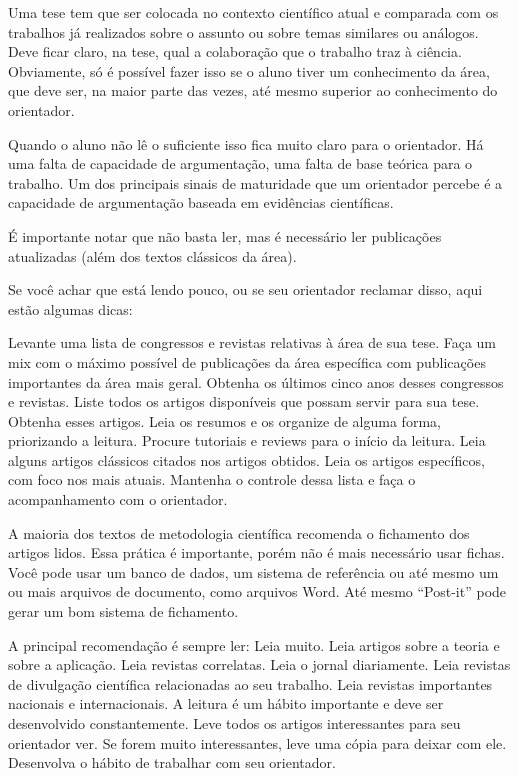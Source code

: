

Uma tese tem que ser colocada no contexto científico atual e comparada com os trabalhos já realizados sobre o assunto ou sobre temas similares ou análogos. Deve ficar claro, na tese, qual a colaboração que o trabalho traz à ciência. Obviamente, só é possível fazer isso se o aluno tiver um conhecimento da área, que deve ser, na maior parte das vezes, até mesmo superior ao conhecimento do orientador.


Quando o aluno não lê o suficiente isso fica muito claro para o orientador. Há uma falta de capacidade de argumentação, uma falta de base teórica para o trabalho. Um dos principais sinais de maturidade que um orientador percebe é a capacidade de argumentação baseada em evidências científicas.


É importante notar que não basta ler, mas é necessário ler publicações atualizadas (além dos textos clássicos da área).


Se você achar que está lendo pouco, ou se seu orientador reclamar disso, aqui estão algumas dicas:

\begin{outline}	
\1	Levante uma lista de congressos e revistas relativas à área de sua tese.
\2	Faça um mix com o máximo possível de publicações da área específica com publicações importantes da área mais geral.
\1	Obtenha os últimos cinco anos desses congressos e revistas.
\1	Liste todos os artigos disponíveis que possam servir para sua tese.
\1	Obtenha esses artigos.
\1	Leia os resumos e os organize de alguma forma, priorizando a leitura.
\2	Procure tutoriais e reviews para o início da leitura.
\2	Leia alguns artigos clássicos citados nos artigos obtidos.
\2 Leia os artigos específicos, com foco nos mais atuais.
\1	Mantenha o controle dessa lista e faça o acompanhamento com o orientador.
\end{outline}

A maioria dos textos de metodologia científica recomenda o fichamento dos artigos lidos. Essa prática é importante, porém não é mais necessário usar fichas. Você pode usar um banco de dados, um sistema de referência ou até mesmo um ou mais arquivos de documento, como arquivos Word. Até mesmo “Post-it” pode gerar um bom sistema de fichamento. 

A principal recomendação é sempre ler: Leia muito. Leia artigos sobre a teoria e sobre a aplicação. Leia revistas correlatas. Leia o jornal diariamente. Leia revistas de divulgação científica relacionadas ao seu trabalho. Leia revistas importantes nacionais e internacionais. A leitura é um hábito importante e deve ser desenvolvido constantemente. Leve todos os artigos interessantes para seu orientador ver. Se forem muito interessantes, leve uma cópia para deixar com ele. Desenvolva o hábito de trabalhar com seu orientador. 



